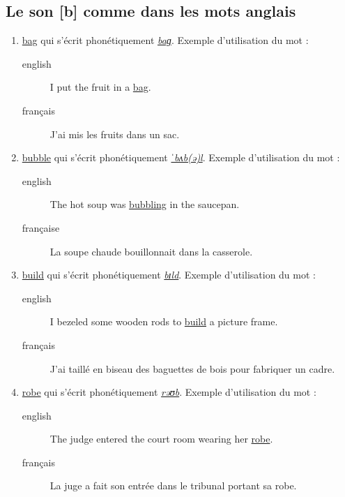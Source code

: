\documentclass[12pt,a4paper]{book}
\begin{document}
\subsection{Le son [b] comme dans les mots anglais}
\label{sec:orgab621dc}
\begin{enumerate}
\item \href{http://www.wordreference.com/enfr/bag}{bag} qui s'écrit phonétiquement \href{https://en.oxforddictionaries.com/definition/bag}{\emph{baɡ}}. Exemple d'utilisation du mot :
\begin{description}
\item[{english}] \textenglish{I put the fruit in a \href{https://youtu.be/DLQhGy7BIjQ}{bag}.}
\item[{français}] J'ai mis les fruits dans un sac.
\end{description}
\item \href{http://www.wordreference.com/enfr/bubble}{bubble} qui s'écrit phonétiquement \href{https://en.oxforddictionaries.com/definition/bubble}{\emph{ˈbʌb(ə)l}}. Exemple d'utilisation du mot :
\begin{description}
\item[{english}] \textenglish{The hot soup was \href{https://youtu.be/h6OhzwkBAEc}{bubbling} in the saucepan.}
\item[{française}] La soupe chaude bouillonnait dans la casserole.
\end{description}
\item \href{http://www.wordreference.com/enfr/build}{build} qui s'écrit phonétiquement \href{https://en.oxforddictionaries.com/definition/build}{\emph{bɪld}}. Exemple d'utilisation du mot :
\begin{description}
\item[{english}] \textenglish{I bezeled some wooden rods to \href{https://youtu.be/UC4eCvuxjIU}{build} a picture frame.}
\item[{français}] J'ai taillé en biseau des baguettes de bois pour fabriquer un cadre.
\end{description}
\item \href{http://www.wordreference.com/enfr/robe}{robe} qui s'écrit phonétiquement \href{https://en.oxforddictionaries.com/definition/robe}{\emph{rəʊb}}. Exemple d'utilisation du mot :
\begin{description}
\item[{english}] \textenglish{The judge entered the court room wearing her \href{https://youtu.be/eiObDiqVcPk}{robe}.}
\item[{français}] La juge a fait son entrée dans le tribunal portant sa
robe.
\end{description}
\end{enumerate}
\end{document}
